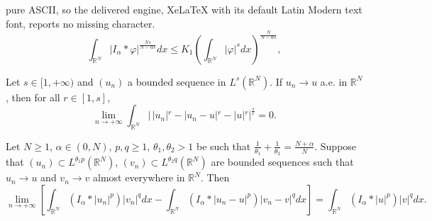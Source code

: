 \documentclass[10pt,a4paper]{amsart}
\begin{document}
pure ASCII, so the delivered engine, XeLaTeX with its default Latin Modern text font, reports no missing character.
\begin{equation}\label{HLS2} \tag{HLS2}
\int_{\mathbb{R}^N} |I_\alpha \ast \varphi|^{\frac{Ns}{N-\alpha s}} dx \leq K_1 \left(\int_{\mathbb{R}^N}  |\varphi|^s dx \right)^{\frac{N}{N-\alpha s}},
\end{equation}

\begin{lemma}\label{l13}
Let $s\in [1, +\infty)$ and $(u_{n})$ a bounded sequence in $L^{s}(\mathbb{R}^N)$. If $u_{n} \rightarrow u$ a.e. in $\mathbb{R}^N$, then for all $r \in [1, s]$, 
$$
\lim\limits_{n\rightarrow + \infty} \int_{\mathbb{R}^N} |\,|u_{n}|^r -|u_{n} - u|^r -|u|^r|^{\frac{s}{r}} = 0.
$$
\end{lemma}

\begin{proposition}\label{l14}
Let $N \geq 1$, $\alpha \in (0, N)$, $p, q \geq 1$, $\theta_1, \theta_2>1$ be such that $\frac{1}{\theta_1}+ \frac{1}{\theta_2} = \frac{N+\alpha}{N}$. Suppose that $(u_n) \subset L^{\theta_1p}(\mathbb{R}^N)$, $(v_n) \subset L^{\theta_2q}(\mathbb{R}^N)$ are bounded sequences such that $u_n \to u$ and $v_n \to v$ almost everywhere in $\mathbb{R}^N$. Then
$$
\lim\limits_{n\rightarrow +\infty} \left[\int_{\mathbb{R}^N} (I_\alpha \ast |u_{n}|^p)|v_{n}|^q dx - \int_{\mathbb{R}^N} (I_\alpha \ast |u_{n} -u|^p)|v_{n} -v|^q dx \right] = \int_{\mathbb{R}^N} (I_\alpha \ast |u|^p)|v|^q dx.
$$
\end{proposition}
\end{document}
